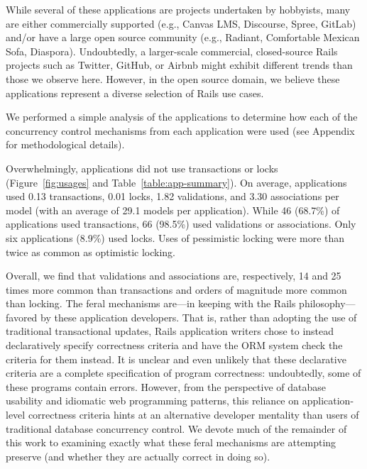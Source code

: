While several of these applications are projects undertaken by
hobbyists, many are either commercially supported (e.g., Canvas LMS,
Discourse, Spree, GitLab) and/or have a large open source community
(e.g., Radiant, Comfortable Mexican Sofa, Diaspora). Undoubtedly, a
larger-scale commercial, closed-source Rails projects such as Twitter,
GitHub, or Airbnb might exhibit different trends than those we observe
here. However, in the open source domain, we believe these
applications represent a diverse selection of Rails use cases.

 We performed a simple analysis of the
applications to determine how each of the concurrency control
mechanisms from each application were used (see Appendix for
methodological details).

Overwhelmingly, applications did not use transactions or locks
(Figure~\ref{fig:usages} and Table~\ref{table:app-summary}). On
average, applications used 0.13 transactions, 0.01 locks, 1.82
validations, and 3.30 associations per model (with an average of 29.1
models per application). While 46 (68.7\%) of applications used
transactions, 66 (98.5\%) used validations or associations. Only six
applications (8.9\%) used locks. Uses of pessimistic locking were more
than twice as common as optimistic locking.

Overall, we find that validations and associations are, respectively,
14 and 25 times more common than transactions and orders of magnitude
more common than locking. The feral mechanisms are---in keeping with
the Rails philosophy---favored by these application developers. That
is, rather than adopting the use of traditional transactional updates,
Rails application writers chose to instead declaratively specify
correctness criteria and have the ORM system check the criteria for
them instead. It is unclear and even unlikely that these declarative
criteria are a complete specification of program correctness:
undoubtedly, some of these programs contain errors. However, from the
perspective of database usability and idiomatic web programming
patterns, this reliance on application-level correctness criteria
hints at an alternative developer mentality than users of traditional
database concurrency control.  We devote much of the remainder of this
work to examining exactly what these feral mechanisms are attempting
preserve (and whether they are actually correct in doing so).

